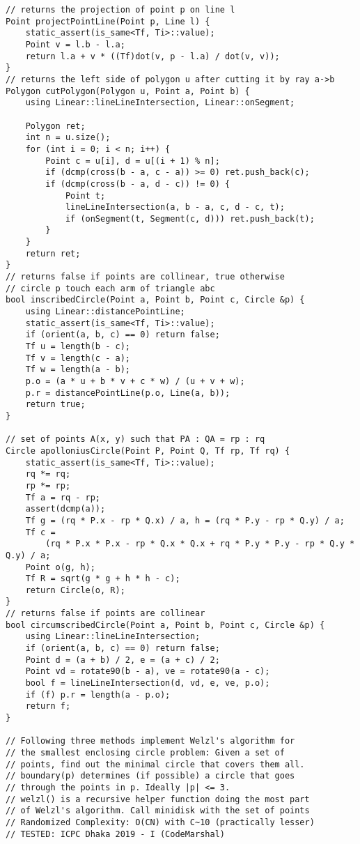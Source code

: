 \documentclass[10pt,a4paper,onesided]{article}
\begin{document}
\begin{multicols*}{3}
\begin{lstlisting}
// returns the projection of point p on line l
Point projectPointLine(Point p, Line l) {
    static_assert(is_same<Tf, Ti>::value);
    Point v = l.b - l.a;
    return l.a + v * ((Tf)dot(v, p - l.a) / dot(v, v));
}
// returns the left side of polygon u after cutting it by ray a->b
Polygon cutPolygon(Polygon u, Point a, Point b) {
    using Linear::lineLineIntersection, Linear::onSegment;

    Polygon ret;
    int n = u.size();
    for (int i = 0; i < n; i++) {
        Point c = u[i], d = u[(i + 1) % n];
        if (dcmp(cross(b - a, c - a)) >= 0) ret.push_back(c);
        if (dcmp(cross(b - a, d - c)) != 0) {
            Point t;
            lineLineIntersection(a, b - a, c, d - c, t);
            if (onSegment(t, Segment(c, d))) ret.push_back(t);
        }
    }
    return ret;
}
// returns false if points are collinear, true otherwise
// circle p touch each arm of triangle abc
bool inscribedCircle(Point a, Point b, Point c, Circle &p) {
    using Linear::distancePointLine;
    static_assert(is_same<Tf, Ti>::value);
    if (orient(a, b, c) == 0) return false;
    Tf u = length(b - c);
    Tf v = length(c - a);
    Tf w = length(a - b);
    p.o = (a * u + b * v + c * w) / (u + v + w);
    p.r = distancePointLine(p.o, Line(a, b));
    return true;
}

// set of points A(x, y) such that PA : QA = rp : rq
Circle apolloniusCircle(Point P, Point Q, Tf rp, Tf rq) {
    static_assert(is_same<Tf, Ti>::value);
    rq *= rq;
    rp *= rp;
    Tf a = rq - rp;
    assert(dcmp(a));
    Tf g = (rq * P.x - rp * Q.x) / a, h = (rq * P.y - rp * Q.y) / a;
    Tf c =
        (rq * P.x * P.x - rp * Q.x * Q.x + rq * P.y * P.y - rp * Q.y * Q.y) / a;
    Point o(g, h);
    Tf R = sqrt(g * g + h * h - c);
    return Circle(o, R);
}
// returns false if points are collinear
bool circumscribedCircle(Point a, Point b, Point c, Circle &p) {
    using Linear::lineLineIntersection;
    if (orient(a, b, c) == 0) return false;
    Point d = (a + b) / 2, e = (a + c) / 2;
    Point vd = rotate90(b - a), ve = rotate90(a - c);
    bool f = lineLineIntersection(d, vd, e, ve, p.o);
    if (f) p.r = length(a - p.o);
    return f;
}

// Following three methods implement Welzl's algorithm for
// the smallest enclosing circle problem: Given a set of
// points, find out the minimal circle that covers them all.
// boundary(p) determines (if possible) a circle that goes
// through the points in p. Ideally |p| <= 3.
// welzl() is a recursive helper function doing the most part
// of Welzl's algorithm. Call minidisk with the set of points
// Randomized Complexity: O(CN) with C~10 (practically lesser)
// TESTED: ICPC Dhaka 2019 - I (CodeMarshal)


\end{lstlisting}
\end{multicols*}
\end{document}
